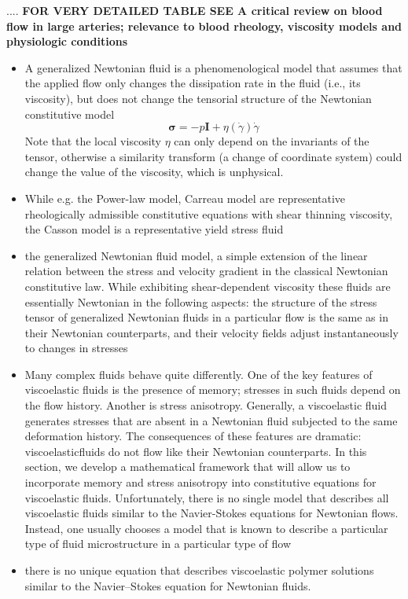 \documentclass[11pt,letterpaper]{article}
\begin{document}
....
{\color{red} \textbf{FOR VERY DETAILED TABLE SEE A critical review on blood flow in large arteries; relevance to blood rheology, viscosity models and physiologic conditions \cite{FuatYilmazandMehmetYasarGundogdu2008_largetable} }}

\begin{itemize}
\item A generalized Newtonian fluid is a phenomenological model that assumes that the applied flow only changes the dissipation rate in the fluid (i.e., its viscosity), but does not change the tensorial structure of the Newtonian constitutive model \cite{Morozov2015_nonnewtonian} \begin{equation}
\bm{\sigma} = -p\bm{I} + \eta(\Dot{\gamma})\Dot{\gamma} 
\end{equation}
Note that the local viscosity $\eta$ can only depend on the invariants of the tensor, otherwise a similarity transform (a change
of coordinate system) could change the value of the viscosity, which is unphysical.
\item While e.g. the Power-law model, Carreau model are representative rheologically admissible constitutive equations with shear thinning viscosity, the Casson model is a representative yield stress fluid
\item the generalized Newtonian fluid model, a simple extension of the linear relation between the stress and velocity gradient in the classical Newtonian constitutive law. While exhibiting shear-dependent viscosity these fluids are essentially Newtonian in the following aspects: the structure of the stress tensor of generalized Newtonian fluids in a particular flow is the same as in their Newtonian counterparts, and their velocity fields adjust instantaneously to changes in stresses
\item Many complex fluids behave quite differently. One of the key features of viscoelastic fluids is the presence of memory; stresses in such fluids depend on the flow history. Another is stress anisotropy. Generally, a viscoelastic fluid generates stresses that are absent in a Newtonian fluid subjected to the same deformation history. The consequences of these features are dramatic: viscoelasticfluids do not
flow like their Newtonian counterparts. In this section, we develop a mathematical framework that will allow us to incorporate memory and stress anisotropy into constitutive equations for viscoelastic fluids. Unfortunately, there is no single model that describes all viscoelastic fluids similar to the Navier-Stokes equations for Newtonian flows. Instead, one usually chooses a model that is known to describe a particular type of fluid microstructure in a particular type of flow
\item there is no unique equation that describes viscoelastic
polymer solutions similar to the Navier–Stokes equation for Newtonian fluids.
\end{itemize}
\end{document}
